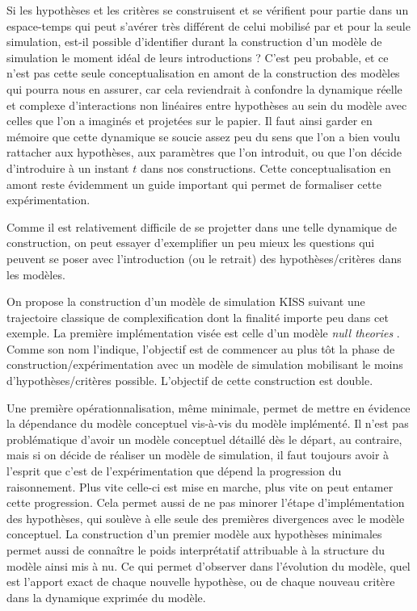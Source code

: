 Si les hypothèses et les critères se construisent et se vérifient pour partie dans un espace-temps qui peut s'avérer très différent de celui mobilisé par et pour la seule simulation, est-il possible d'identifier durant la construction d'un modèle de simulation le moment idéal de leurs introductions ? C'est peu probable, et ce n'est pas cette seule conceptualisation en amont de la construction des modèles qui pourra nous en assurer, car cela reviendrait à confondre la dynamique réelle et complexe d'interactions non linéaires entre hypothèses au sein du modèle avec celles que l'on a imaginés et projetées sur le papier. Il faut ainsi garder en mémoire que cette dynamique se soucie assez peu du sens que l'on a bien voulu rattacher aux hypothèses, aux paramètres que l'on introduit, ou que l'on décide d'introduire à un instant $t$ dans nos constructions. Cette conceptualisation en amont reste évidemment un guide important qui permet de formaliser cette expérimentation.

Comme il est relativement difficile de se projetter dans une telle dynamique de construction, on peut essayer d'exemplifier un peu mieux les questions qui peuvent se poser avec l'introduction (ou le retrait) des hypothèses/critères dans les modèles. 

On propose la construction d'un modèle de simulation KISS suivant une trajectoire classique de complexification dont la finalité importe peu dans cet exemple. La première implémentation visée est celle d'un modèle \textit{null theories} \textcite{Railsback2012}. Comme son nom l'indique, l'objectif est de commencer au plus tôt la phase de construction/expérimentation avec un modèle de simulation mobilisant le moins d'hypothèses/critères possible. L'objectif de cette construction est double. 

Une première opérationnalisation, même minimale, permet de mettre en évidence la dépendance du modèle conceptuel vis-à-vis du modèle implémenté. Il n'est pas problématique d'avoir un modèle conceptuel détaillé dès le départ, au contraire, mais si on décide de réaliser un modèle de simulation, il faut toujours avoir à l'esprit que c'est de l'expérimentation que dépend la progression du raisonnement. Plus vite celle-ci est mise en marche, plus vite on peut entamer cette progression. Cela permet aussi de ne pas minorer l'étape d'implémentation des hypothèses, qui soulève à elle seule des premières divergences avec le modèle conceptuel. La construction d'un premier modèle aux hypothèses minimales permet aussi de connaître le poids interprétatif attribuable à la structure du modèle ainsi mis à nu. Ce qui permet d’observer dans l’évolution du modèle, quel est l’apport exact de chaque nouvelle hypothèse, ou de chaque nouveau critère dans la dynamique exprimée du modèle.

